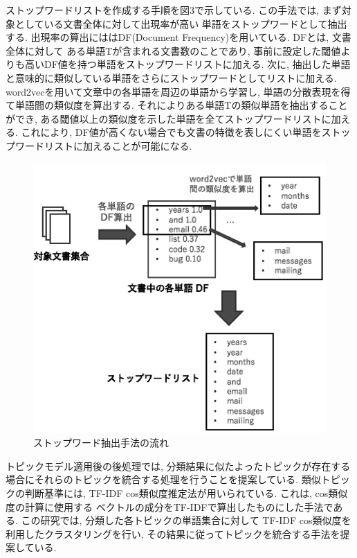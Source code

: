 \documentclass{ltjarticle}
\begin{document}
ストップワードリストを作成する手順を図3で示している. この手法では, まず対象としている文書全体に対して出現率が高い
単語をストップワードとして抽出する. 出現率の算出にははDF(Document Frequency)を用いている. DFとは, 文書全体に対して
ある単語Tが含まれる文書数のことであり, 事前に設定した閾値よりも高いDF値を持つ単語をストップワードリストに加える. 
次に, 抽出した単語と意味的に類似している単語をさらにストップワードとしてリストに加える. 
word2vecを用いて文章中の各単語を周辺の単語から学習し, 単語の分散表現を得て単語間の類似度を算出する.  
それによりある単語Tの類似単語を抽出することができ, ある閾値以上の類似度を示した単語を全てストップワードリストに加える. 
これにより, DF値が高くない場合でも文書の特徴を表しにくい単語をストップワードリストに加えることが可能になる. 
\begin{figure}[h]
    \centering
    \includegraphics[]{images/fig3.png}
    \caption{ストップワード抽出手法の流れ}
\end{figure}

トピックモデル適用後の後処理では, 分類結果に似たよったトピックが存在する場合にそれらのトピックを統合する処理を行うことを提案している. 
類似トピックの判断基準には, TF-IDF cos類似度推定法が用いられている. これは, cos類似度の計算に使用する
ベクトルの成分をTF-IDFで算出したものにした手法である. この研究では, 分類した各トピックの単語集合に対して
TF-IDF cos類似度を利用したクラスタリングを行い, その結果に従ってトピックを統合する手法を提案している. 
\end{document}

